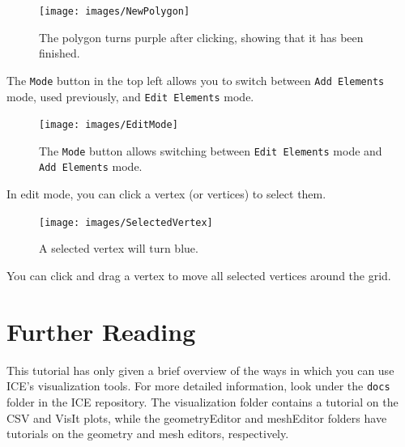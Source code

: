 \begin{figure}[!h]
\texttt{[image: images/NewPolygon]}
\centering
\caption{The polygon turns purple after clicking, showing that it has been
finished.}
\label{fig:newpolygon}
\end{figure}

The \texttt{Mode} button in the top left allows you to switch between
\texttt{Add Elements} mode, used previously, and \texttt{Edit Elements} mode.

\begin{figure}[!h]
\texttt{[image: images/EditMode]}
\centering
\caption{The \texttt{Mode} button allows switching between \texttt{Edit
Elements} mode and \texttt{Add Elements} mode.}
\label{fig:editmode}
\end{figure}

In edit mode, you can click a vertex (or vertices) to select them. 

\begin{figure}[!h]
\texttt{[image: images/SelectedVertex]}
\centering
\caption{A selected vertex will turn blue.}
\label{fig:selectedvertex}
\end{figure}

You can click and drag a vertex to move all selected vertices around the grid.

\section{Further Reading}

This tutorial has only given a brief overview of the ways in which you can use
ICE's visualization tools. For more detailed information, look under the
\texttt{docs} folder in the ICE repository. The visualization folder contains a
tutorial on the CSV and VisIt plots, while the geometryEditor and meshEditor
folders have tutorials on the geometry and mesh editors, respectively. 